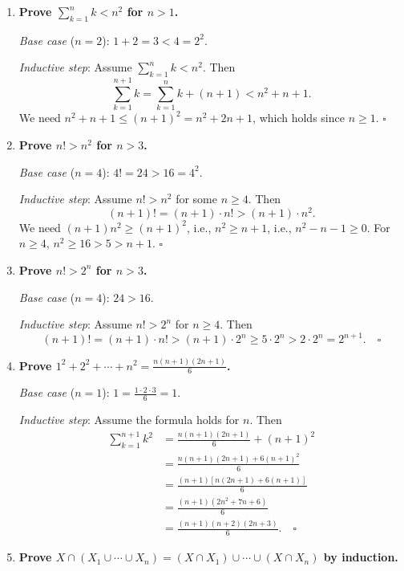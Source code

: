 \documentclass[11pt,openany]{book}
\begin{document}
\begin{enumerate}[{0.}1. ]
\item \textbf{Prove $\sum_{k=1}^n k < n^2$ for $n > 1$.}

\textit{Base case} ($n=2$): $1+2=3 < 4=2^2$. \checkmark

\textit{Inductive step}: Assume $\sum_{k=1}^n k < n^2$. Then
\[
\sum_{k=1}^{n+1} k = \sum_{k=1}^n k + (n+1) < n^2 + n + 1.
\]
We need $n^2 + n + 1 \leq (n+1)^2 = n^2+2n+1$, which holds since $n \geq 1$. $\square$

\item \textbf{Prove $n! > n^2$ for $n > 3$.}

\textit{Base case} ($n=4$): $4! = 24 > 16 = 4^2$. \checkmark

\textit{Inductive step}: Assume $n! > n^2$ for some $n \geq 4$. Then
\[
(n+1)! = (n+1)\cdot n! > (n+1)\cdot n^2.
\]
We need $(n+1)n^2 \geq (n+1)^2$, i.e., $n^2 \geq n+1$, i.e., $n^2 - n - 1 \geq 0$. For $n \geq 4$, $n^2 \geq 16 > 5 > n+1$. $\square$

\item \textbf{Prove $n! > 2^n$ for $n > 3$.}

\textit{Base case} ($n=4$): $24 > 16$. \checkmark

\textit{Inductive step}: Assume $n! > 2^n$ for $n \geq 4$. Then
\[
(n+1)! = (n+1)\cdot n! > (n+1)\cdot 2^n \geq 5\cdot 2^n > 2 \cdot 2^n = 2^{n+1}. \quad\square
\]

\item \textbf{Prove $1^2+2^2+\cdots+n^2 = \frac{n(n+1)(2n+1)}{6}$.}

\textit{Base case} ($n=1$): $1 = \frac{1\cdot 2\cdot 3}{6}=1$. \checkmark

\textit{Inductive step}: Assume the formula holds for $n$. Then
\begin{align*}
\sum_{k=1}^{n+1}k^2 &= \frac{n(n+1)(2n+1)}{6} + (n+1)^2\\
&= \frac{n(n+1)(2n+1)+6(n+1)^2}{6}\\
&= \frac{(n+1)[n(2n+1)+6(n+1)]}{6}\\
&= \frac{(n+1)(2n^2+7n+6)}{6}\\
&= \frac{(n+1)(n+2)(2n+3)}{6}. \quad\square
\end{align*}

\item \textbf{Prove $X\cap(X_1\cup\cdots\cup X_n) = (X\cap X_1)\cup\cdots\cup(X\cap X_n)$ by induction.}


\end{enumerate}
\end{document}
